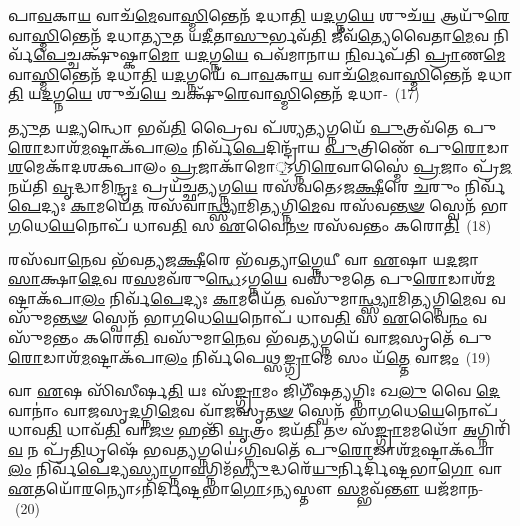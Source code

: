 𑌪𑌾\-\ul{𑌵}\-𑌕𑌾\-\ul{𑌯} 𑌵𑌾𑌚᳴\-\ul{𑌮𑍇}\-𑌵𑌾\-\ul{𑌸𑍍𑌮𑌿}\-𑌨𑍍𑌤𑍇𑌨᳴ 𑌦𑌧𑌾\-\ul{𑌤𑌿} 𑌯\-\ul{𑌦}\-𑌗𑍍𑌨\-\ul{𑌯𑍇} 𑌶𑍁𑌚᳴\-\ul{𑌯} 𑌆𑌯𑍁᳴\-\ul{𑌰𑍇}\-𑌵𑌾\-\ul{𑌸𑍍𑌮𑌿}\-𑌨𑍍𑌤𑍇𑌨᳴ 𑌦𑌧𑌾\-\ul{𑌤𑍍𑌯𑍁}\-𑌤 𑌯\-\ul{𑌦𑍀}\-𑌤𑌾\-\ul{𑌸𑍁}\-𑌰𑍍𑌭𑌵᳴\-\ul{𑌤𑌿} 𑌜𑍀𑌵᳴\-\ul{𑌤𑍍𑌯𑍇}\-𑌵𑍈𑌤𑌾\-\ul{𑌮𑍇}\-𑌵 𑌨𑌿𑌰𑍍𑌵᳴\-\ul{𑌪𑍇}\-𑌚𑍍𑌚𑌕𑍍𑌷𑍁᳴𑌷𑍍𑌕𑌾\-\ul{𑌮𑍋} 𑌯\-\ul{𑌦}\-𑌗𑍍𑌨\-\ul{𑌯𑍇} 𑌪𑌵᳴𑌮𑌾𑌨𑌾𑌯 \ul{𑌨𑌿}\-𑌰𑍍𑌵𑌪᳴𑌤𑌿 \ul{𑌪𑍍𑌰𑌾}\-𑌣\-\ul{𑌮𑍇}\-𑌵𑌾\-\-\ul{𑌸𑍍𑌮𑌿}\-𑌨𑍍𑌤𑍇𑌨᳴ 𑌦𑌧𑌾\-\ul{𑌤𑌿} 𑌯\-\ul{𑌦}\-𑌗𑍍𑌨𑌯𑍇᳴ 𑌪𑌾\-\ul{𑌵}\-𑌕𑌾\-\ul{𑌯} 𑌵𑌾𑌚᳴\-\ul{𑌮𑍇}\-𑌵𑌾\-\ul{𑌸𑍍𑌮𑌿}\-𑌨𑍍𑌤𑍇𑌨᳴ 𑌦𑌧𑌾\-\ul{𑌤𑌿} 𑌯\-\ul{𑌦}\-𑌗𑍍𑌨\-\ul{𑌯𑍇} 𑌶𑍁𑌚᳴\-\ul{𑌯𑍇} 𑌚𑌕𑍍𑌷𑍁᳴\-\ul{𑌰𑍇}\-𑌵𑌾\-\ul{𑌸𑍍𑌮𑌿}\-𑌨𑍍𑌤𑍇𑌨᳴ 𑌦𑌧𑌾-~(17)

\-\ul{𑌤𑍍𑌯𑍁}\-𑌤 𑌯\-\ul{𑌦𑍍𑌯}\-𑌨𑍍𑌧𑍋 𑌭𑌵᳴\-\ul{𑌤𑌿} 𑌪𑍍𑌰𑍈𑌵 𑌪᳴𑌶𑍍𑌯\-\ul{𑌤𑍍𑌯}\-𑌗𑍍𑌨𑌯𑍇᳴ \ul{𑌪𑍁}\-𑌤𑍍𑌰𑌵᳴𑌤𑍇 𑌪𑍁\-\ul{𑌰𑍋}\-𑌡𑌾𑌶᳴\-\-\ul{𑌮}\-𑌷𑍍𑌟𑌾\-𑌕᳴𑌪𑌾\-\ul{𑌲𑌂} 𑌨𑌿𑌰𑍍𑌵᳴\-\ul{𑌪𑍇}\-𑌦𑌿𑌨𑍍𑌦𑍍𑌰𑌾᳴𑌯 \ul{𑌪𑍁}\-𑌤𑍍𑌰𑌿𑌣𑍇᳴ 𑌪𑍁\-\ul{𑌰𑍋}\-𑌡𑌾\-\ul{𑌶}\-𑌮𑍇𑌕𑌾᳴\-𑌦𑌶\-𑌕𑌪𑌾𑌲𑌂 \ul{𑌪𑍍𑌰}\-𑌜𑌾𑌕𑌾᳴𑌮𑍋़॒\-𑌽𑌗𑍍𑌨𑌿\-\ul{𑌰𑍇}\-𑌵𑌾𑌸𑍍𑌮𑍈॑ \ul{𑌪𑍍𑌰}\-𑌜𑌾𑌂 𑌪𑍍𑌰᳴\-\ul{𑌜}\-𑌨𑌯᳴𑌤𑌿 \ul{𑌵𑍃}\-𑌦𑍍𑌧𑌾𑌮𑌿\-\ul{𑌨𑍍𑌦𑍍𑌰𑌃} 𑌪𑍍𑌰𑌯᳴𑌚𑍍𑌛\-\ul{𑌤𑍍𑌯}\-𑌗𑍍𑌨\-\ul{𑌯𑍇} 𑌰𑌸᳴𑌵𑌤𑍇\-𑌽𑌜\-\ul{𑌕𑍍𑌷𑍀}\-𑌰𑍇 \ul{𑌚}\-𑌰𑍁𑌂 𑌨𑌿𑌰𑍍𑌵᳴\-\ul{𑌪𑍇}\-𑌦𑍍𑌯𑌃 \ul{𑌕𑌾}\-𑌮𑌯𑍇᳴\-\ul{𑌤} 𑌰𑌸᳴𑌵𑌾\-\ul{𑌨𑍍𑌥𑍍𑌸𑍍𑌯𑌾}\-𑌮𑌿\-\ul{𑌤𑍍𑌯}\-𑌗𑍍𑌨𑌿\-\ul{𑌮𑍇}\-𑌵 𑌰𑌸᳴𑌵\-\ul{𑌨𑍍𑌤}\-\-\ul{𑍟} 𑌸𑍍𑌵𑍇𑌨᳴ 𑌭𑌾\-\ul{𑌗}\-𑌧𑍇\-\ul{𑌯𑍇}\-𑌨𑍋𑌪᳴ 𑌧𑌾𑌵\-\ul{𑌤𑌿} 𑌸 \ul{𑌏}\-𑌵𑍈\-\ul{𑌨}\-\-\ul{𑍞} 𑌰𑌸᳴𑌵𑌨𑍍𑌤𑌂 𑌕𑌰𑍋\-\ul{𑌤𑌿}\-~(18)

𑌰𑌸᳴𑌵𑌾\-\ul{𑌨𑍇}\-𑌵 𑌭᳴𑌵𑌤𑍍𑌯𑌜\-\ul{𑌕𑍍𑌷𑍀}\-𑌰𑍇 𑌭᳴𑌵𑌤𑍍𑌯𑌾\-\ul{𑌗𑍍𑌨𑍇}\-𑌯𑍀 𑌵𑌾 \ul{𑌏}\-𑌷𑌾 𑌯\-\ul{𑌦}\-𑌜𑌾 \ul{𑌸𑌾}\-𑌕𑍍𑌷𑌾\-\ul{𑌦𑍇}\-𑌵 𑌰\-\ul{𑌸}\-𑌮𑌵᳴\-𑌰𑍁\-\ul{𑌨𑍍𑌧𑍇}\-\-𑌽𑌗𑍍𑌨\-\ul{𑌯𑍇} 𑌵𑌸𑍁᳴𑌮𑌤𑍇 𑌪𑍁\-\ul{𑌰𑍋}\-𑌡𑌾𑌶᳴\-\-\ul{𑌮}\-𑌷𑍍𑌟𑌾\-𑌕᳴𑌪𑌾\-\ul{𑌲𑌂} 𑌨𑌿𑌰𑍍𑌵᳴\-\ul{𑌪𑍇}\-𑌦𑍍𑌯𑌃 \ul{𑌕𑌾}\-𑌮𑌯𑍇᳴\-\ul{𑌤} 𑌵𑌸𑍁᳴𑌮𑌾\-\ul{𑌨𑍍𑌥𑍍𑌸𑍍𑌯𑌾}\-𑌮𑌿\-\ul{𑌤𑍍𑌯}\-𑌗𑍍𑌨𑌿\-\ul{𑌮𑍇}\-𑌵 𑌵𑌸𑍁᳴𑌮\-\ul{𑌨𑍍𑌤}\-\-\ul{𑍟} 𑌸𑍍𑌵𑍇𑌨᳴ 𑌭𑌾\-\ul{𑌗}\-𑌧𑍇\-\ul{𑌯𑍇}\-𑌨𑍋𑌪᳴ 𑌧𑌾𑌵\-\ul{𑌤𑌿} 𑌸 \ul{𑌏}\-𑌵𑍈\-\ul{𑌨𑌂} 𑌵𑌸𑍁᳴𑌮𑌨𑍍𑌤𑌂 𑌕𑌰𑍋\-\ul{𑌤𑌿} 𑌵𑌸𑍁᳴𑌮𑌾\-\ul{𑌨𑍇}\-𑌵 𑌭᳴𑌵\-\ul{𑌤𑍍𑌯}\-𑌗𑍍𑌨𑌯𑍇᳴ 𑌵𑌾\-\ul{𑌜}\-𑌸𑍃𑌤𑍇᳴ 𑌪𑍁\-\ul{𑌰𑍋}\-𑌡𑌾𑌶᳴\-\-\ul{𑌮}\-𑌷𑍍𑌟𑌾\-𑌕᳴𑌪𑌾\-\ul{𑌲𑌂} 𑌨𑌿𑌰𑍍𑌵᳴𑌪𑍇𑌥𑍍𑌸\-\ul{𑌙𑍍𑌗𑍍𑌰𑌾}\-𑌮𑍇 𑌸𑌂 𑌯᳴\-\ul{𑌤𑍍𑌤𑍇} 𑌵𑌾\-\ul{𑌜𑌂}\-~(19)

𑌵𑌾 \ul{𑌏}\-𑌷 𑌸𑌿᳴𑌸𑍀𑌰𑍍\mbox{}𑌷\-\ul{𑌤𑌿} 𑌯𑌃 𑌸᳴\-\ul{𑌙𑍍𑌗𑍍𑌰𑌾}\-𑌮𑌂 𑌜𑌿𑌗𑍀᳴𑌷\-\ul{𑌤𑍍𑌯}\-𑌗𑍍𑌨𑌿𑌃 𑌖\-\ul{𑌲𑍁} 𑌵𑍈 \ul{𑌦𑍇}\-𑌵𑌾𑌨𑌾𑌂॑ 𑌵𑌾\-\ul{𑌜}\-𑌸𑍃\-\ul{𑌦}\-𑌗𑍍𑌨𑌿\-\ul{𑌮𑍇}\-𑌵 𑌵𑌾᳴\-\ul{𑌜}\-𑌸𑍃\-\ul{𑌤}\-\-\ul{𑍟} 𑌸𑍍𑌵𑍇𑌨᳴ 𑌭𑌾\-\ul{𑌗}\-𑌧𑍇\-\ul{𑌯𑍇}\-𑌨𑍋𑌪᳴ 𑌧𑌾𑌵\-\ul{𑌤𑌿} 𑌧𑌾𑌵᳴\-\ul{𑌤𑌿} 𑌵𑌾\-\ul{𑌜}\-\-\ul{𑍞} 𑌹𑌨𑍍𑌤𑌿᳴ \ul{𑌵𑍃}\-𑌤𑍍𑌰𑌂 𑌜𑌯᳴\-\ul{𑌤𑌿} 𑌤𑍞 𑌸᳴\-\ul{𑌙𑍍𑌗𑍍𑌰𑌾}\-𑌮𑌮𑌥𑍋᳴ \ul{𑌅}\-𑌗𑍍𑌨𑌿𑌰𑌿᳴\-\ul{𑌵} 𑌨 𑌪𑍍𑌰᳴\-\ul{𑌤𑌿}\-𑌧𑍃𑌷𑍇᳴ 𑌭𑌵\-\ul{𑌤𑍍𑌯}\-𑌗𑍍𑌨𑌯𑍇॑\-𑌽\-\ul{𑌗𑍍𑌨𑌿}\-𑌵𑌤𑍇᳴ 𑌪𑍁\-\ul{𑌰𑍋}\-𑌡𑌾𑌶᳴\-\-\ul{𑌮}\-𑌷𑍍𑌟𑌾\-𑌕᳴𑌪𑌾\-\ul{𑌲𑌂} 𑌨𑌿𑌰𑍍𑌵᳴\-\ul{𑌪𑍇}\-𑌦𑍍𑌯\-\ul{𑌸𑍍𑌯𑌾}\-𑌗𑍍𑌨𑌾\-\ul{𑌵}\-𑌗𑍍𑌨𑌿𑌮᳴\-\ul{𑌭𑍍𑌯𑍁}\-𑌦𑍍𑌧𑌰𑍇᳴\-\ul{𑌯𑍁}\-𑌰𑍍𑌨𑌿𑌰𑍍𑌦𑌿᳴𑌷𑍍𑌟𑌭𑌾\-\ul{𑌗𑍋} 𑌵𑌾 \ul{𑌏}\-𑌤𑌯𑍋᳴\-\ul{𑌰}\-𑌨𑍍𑌯𑍋\-𑌽𑌨𑌿᳴𑌰𑍍𑌦𑌿𑌷𑍍𑌟𑌭𑌾\-\ul{𑌗𑍋}\-\-𑌽𑌨𑍍𑌯𑌸𑍍𑌤𑍗 \ul{𑌸}\-𑌮𑍍𑌭𑌵᳴\-\ul{𑌨𑍍𑌤𑍗} 𑌯𑌜᳴𑌮𑌾𑌨-~(20)

